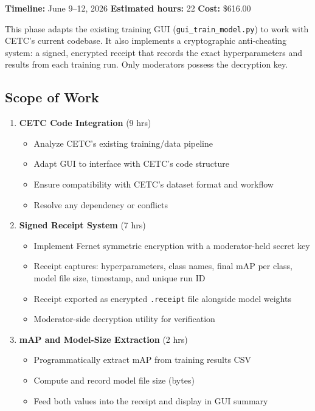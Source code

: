\documentclass[a4paper]{article}
\begin{document}
\noindent\textbf{Timeline:} June 9--12, 2026 \hfill \textbf{Estimated hours:} 22 \hfill \textbf{Cost:} \$616.00

\vspace{0.5em}

This phase adapts the existing training GUI (\texttt{gui\_train\_model.py}) to work with CETC's current codebase. It also implements a cryptographic anti-cheating system: a signed, encrypted receipt that records the exact hyperparameters and results from each training run. Only moderators possess the decryption key.

\subsection*{Scope of Work}

\begin{enumerate}[leftmargin=*]
    \item \textbf{CETC Code Integration} (9 hrs)
    \begin{itemize}
        \item Analyze CETC's existing training/data pipeline
        \item Adapt GUI to interface with CETC's code structure
        \item Ensure compatibility with CETC's dataset format and workflow
        \item Resolve any dependency or conflicts
    \end{itemize}

    \item \textbf{Signed Receipt System} (7 hrs)
    \begin{itemize}
        \item Implement Fernet symmetric encryption with a moderator-held secret key
        \item Receipt captures: hyperparameters, class names, final mAP per class, model file size, timestamp, and unique run ID
        \item Receipt exported as encrypted \texttt{.receipt} file alongside model weights
        \item Moderator-side decryption utility for verification
    \end{itemize}

    \item \textbf{mAP and Model-Size Extraction} (2 hrs)
    \begin{itemize}
        \item Programmatically extract mAP from training results CSV
        \item Compute and record model file size (bytes)
        \item Feed both values into the receipt and display in GUI summary
    \end{itemize}


\end{enumerate}
\end{document}
